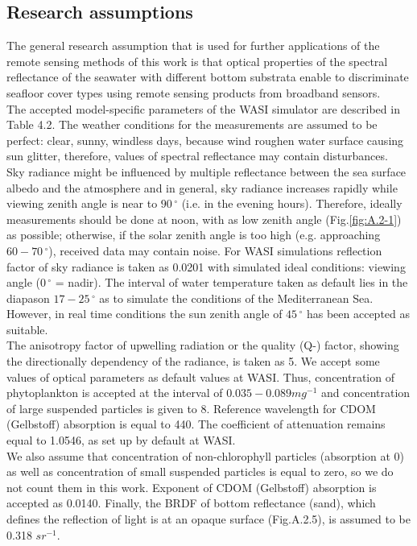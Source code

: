 \documentclass[11pt]{article}
\begin{document}
\subsection{Research assumptions}
The general research assumption that is used for further applications of the remote sensing methods of this work is that optical properties of the spectral reflectance of the seawater with different bottom substrata enable to discriminate seafloor cover types using remote sensing products from broadband sensors.\vspace{1ex}\\
The accepted model-specific parameters of the \ac{WASI} simulator are described in Table 4.2. The weather conditions for the measurements are assumed to be perfect: clear, sunny, windless days, because wind roughen water surface causing sun glitter, therefore, values of spectral reflectance may contain disturbances. \\ Sky radiance might be influenced by multiple reflectance between the sea surface albedo and the atmosphere and in general, sky radiance increases rapidly while viewing zenith angle is near to $90\,^{\circ}$ (i.e. in the evening hours). Therefore, ideally measurements should be done at noon, with as low zenith angle (Fig.\ref{fig:A.2-1})\label{zenith} as possible; otherwise, if the solar zenith angle is too high (e.g. approaching $60-70\,^{\circ}$), received data may contain noise. For \ac{WASI} simulations reflection factor of sky radiance is taken as 0.0201 with simulated ideal conditions: viewing angle ($0\,^{\circ}$ = nadir). The interval of water temperature taken as default lies in the diapason $17-25\,^{\circ}$ as to simulate the conditions of the Mediterranean Sea. However, in real time conditions the sun zenith angle of $45\,^{\circ}$ has been accepted as suitable.\vspace{1ex}\\
The anisotropy factor of upwelling radiation or the quality (Q-) factor, showing the directionally dependency of the radiance, is taken as 5. We accept some values of optical parameters as default values at \ac{WASI}. Thus, concentration of phytoplankton is accepted at the interval of $0.035-0.089 mg^{-1}$ and concentration of large suspended particles is given to 8. Reference wavelength for \ac{CDOM} (Gelbstoff) absorption is equal to 440. The coefficient of attenuation remains equal to 1.0546, as set up by default at \ac{WASI}.\vspace{1ex}\\
We also assume that concentration of non-chlorophyll particles (absorption at 0) as well as concentration of small suspended particles is equal to zero, so we do not count them in this work. Exponent of \ac{CDOM} (Gelbstoff) absorption is accepted as 0.0140. Finally, the \ac{BRDF} of bottom reflectance (sand), which defines the reflection of light  is at an opaque surface (Fig.A.2.5), is assumed to be 0.318 $sr^{-1}$.
\end{document}
